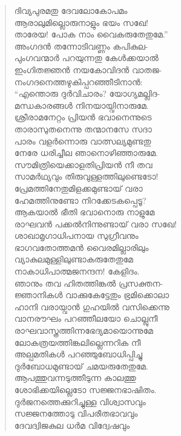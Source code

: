 \begin{verse}
ദിവ്യപുരമതു ദേവലോകോപമം\\
ആരാലുമില്ലൊരുനാളും ഭയം സഖേ!\\
താരേയ! പോക നാം വൈകരുതേതുമേ.”\\
അംഗദന്‍ തന്നോടിവണ്ണം കപികുല-\\
പുംഗവന്മാര്‍ പറയുന്നതു കേള്‍ക്കയാല്‍\\
ഇംഗിതജ്ഞന്‍ നയകോവിദന്‍ വാതജ-\\
നംഗദനെത്തഴുകിപ്പറഞ്ഞീടിനാന്‍:\\
“എന്തൊരു ദുര്‍വിചാരം? യോഗ്യമല്ലിദ-\\
മന്ധകാരങ്ങള്‍ നിനയായ്വിനാരുമേ.\\
ശ്രീരാമനേറ്റം പ്രിയന്‍ ഭവാനെന്നുടെ\\
താരാസുതനെന്നു തന്മാനസേ സദാ\\
പാരം വളര്‍ന്നൊരു വാത്സല്യമുണ്ടതു\\
നേരേ ധരിച്ചീല ഞാനൊഴിഞ്ഞാരുമേ.\\
സൗമിത്രിയെക്കാളതിപ്രിയന്‍ നീ തവ\\
സാമര്‍ഥ്യവും തിരുവുള്ളത്തിലുണ്ടെടോ!\\
പ്രേമത്തിനേതുമിളക്കമുണ്ടായ് വരാ\\
ഹേമത്തിനുണ്ടോ നിറക്കേടകപ്പെടൂ?\\
ആകയാല്‍ ഭീതി ഭവാനൊരു നാളുമേ\\
രാഘവന്‍ പക്കല്‍നിന്നുണ്ടായ് വരാ സഖേ!\\
ശാഖാമൃഗാധിപനായ സുഗ്രീവനും\\
ഭാഗവതോത്തമന്‍ വൈരമില്ലാരിലും\\
വ്യാകുലമുള്ളിലുണ്ടാകരുതേതുമേ\\
നാകാധിപാത്മജനന്ദന! കേളിദം.\\
ഞാനും തവ ഹിതത്തിങ്കല്‍ പ്രസക്തന-\\
ജ്ഞാനികള്‍ വാക്കുകേട്ടേതും ഭ്രമിക്കൊലാ\\
ഹാനി വരായ്വാന്‍ ഗുഹയില്‍ വസിക്കെന്നു\\
വാനരൗഘം പറഞ്ഞീലയോ ചൊല്ലുനീ\\
രാഘവാസ്ത്രത്തിന്നഭേദ്യമായൊന്നുമേ\\
ലോകത്രയത്തിങ്കലില്ലെന്നറിക നീ\\
അല്പമതികള്‍ പറഞ്ഞുബോധിപ്പിച്ചു\\
ദുര്‍ബോധമുണ്ടായ് ചമയരുതേതുമേ.\\
ആപത്തുവന്നടുത്തീടുന്ന കാലത്തു\\
ശോഭിക്കയില്ലെടോ സജ്ജനഭാഷിതം.\\
ദുര്‍ജനത്തെക്കുറിച്ചുള്ള വിശ്വാസവും\\
സജ്ജനത്തോടു വിപരീതഭാവവും\\
ദേവദ്വിജകുല ധര്‍മ വിദ്വേഷവും\\

\end{verse}
